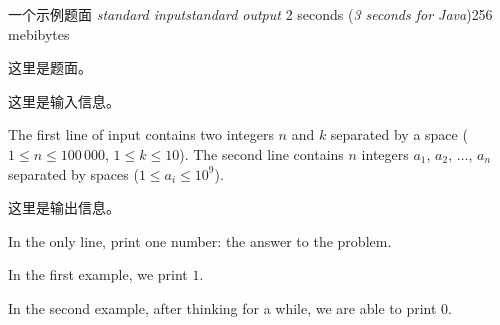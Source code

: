 \gdef\thisproblemauthor{示例作者}
\gdef\thisproblemdeveloper{Ivan Kazmenko}
\gdef\thisproblemorigin{\texttt{XXXIII} St. Petersburg State University Championship}
\begin{problem}{一个示例题面}
{\textsl{standard input}}{\textsl{standard output}}
{2 seconds (\textsl{3 seconds for Java})}{256 mebibytes}{}

这里是题面。

\InputFile

这里是输入信息。

\begin{english} %
    The first line of input contains two integers $n$ and $k$ separated by a space
    ($1 \le n \le 100\,000$, $1 \le k \le 10$).
    The second line contains $n$ integers
    $a_1$, $a_2$, $\ldots$, $a_n$ separated by spaces
    ($1 \le a_i \le 10^9$).
\end{english}

\OutputFile

这里是输出信息。

\begin{english} %
    In the only line, print one number: the answer to the problem.
\end{english}

\Examples

\begin{example}
%
%
\end{example}

\begin{example}
%
\end{example}

\begin{examplewide}
%
\end{examplewide}

\begin{examplethree}
%
\end{examplethree}

\Explanations

In the first example, we print $1$.

In the second example, after thinking for a while, we are able to print $0$.

\end{problem}
